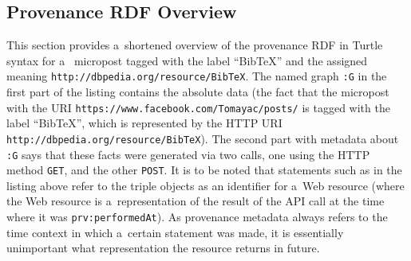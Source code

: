 \subsection{Provenance RDF Overview}                                           \label{sec:appendix}
This section provides a~shortened overview of the provenance RDF in Turtle syntax for a~ micropost tagged with the label ``BibTeX'' and the assigned
meaning \texttt{http://dbpedia.org/resource/BibTeX}. The named graph \texttt{:G} in the first part of the listing contains the absolute data (the fact that the  micropost with the URI \texttt{https://www.facebook.com/Tomayac/posts/} is tagged with the label ``BibTeX'', which is represented by the HTTP URI \texttt{http://dbpedia.org/resource/BibTeX}). The second part with metadata about \texttt{:G} says that these facts were generated via two calls, one using the HTTP method \texttt{GET}, and the other \texttt{POST}.
It is to be noted that statements such as in the listing above refer to the triple objects as an identifier for a~Web resource (where the Web resource is a~representation of the result of the API call at the time where it was \texttt{prv:performedAt}). As provenance metadata always refers to the time context in which a~certain statement was made, it is essentially unimportant what representation the resource returns in future.


